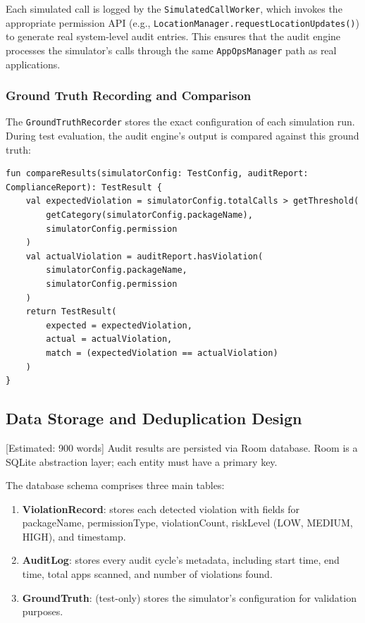 Each simulated call is logged by the \texttt{SimulatedCallWorker}, which invokes the appropriate permission API (e.g., \texttt{LocationManager.requestLocationUpdates()}) to generate real system-level audit entries. This ensures that the audit engine processes the simulator's calls through the same \texttt{AppOpsManager} path as real applications.

\subsubsection{Ground Truth Recording and Comparison}
The \texttt{GroundTruthRecorder} stores the exact configuration of each simulation run. During test evaluation, the audit engine's output is compared against this ground truth:

\begin{lstlisting}[caption=Ground truth comparison]
fun compareResults(simulatorConfig: TestConfig, auditReport: ComplianceReport): TestResult {
    val expectedViolation = simulatorConfig.totalCalls > getThreshold(
        getCategory(simulatorConfig.packageName),
        simulatorConfig.permission
    )
    val actualViolation = auditReport.hasViolation(
        simulatorConfig.packageName,
        simulatorConfig.permission
    )
    return TestResult(
        expected = expectedViolation,
        actual = actualViolation,
        match = (expectedViolation == actualViolation)
    )
}
\end{lstlisting}

\subsection{Data Storage and Deduplication Design} [Estimated: 900 words]
Audit results are persisted via Room database. Room is a SQLite abstraction layer; each entity must have a primary key.

The database schema comprises three main tables:
\begin{enumerate}
\item \textbf{ViolationRecord}: stores each detected violation with fields for packageName, permissionType, violationCount, riskLevel (LOW, MEDIUM, HIGH), and timestamp.
\item \textbf{AuditLog}: stores every audit cycle's metadata, including start time, end time, total apps scanned, and number of violations found.
\item \textbf{GroundTruth}: (test-only) stores the simulator's configuration for validation purposes.
\end{enumerate}

